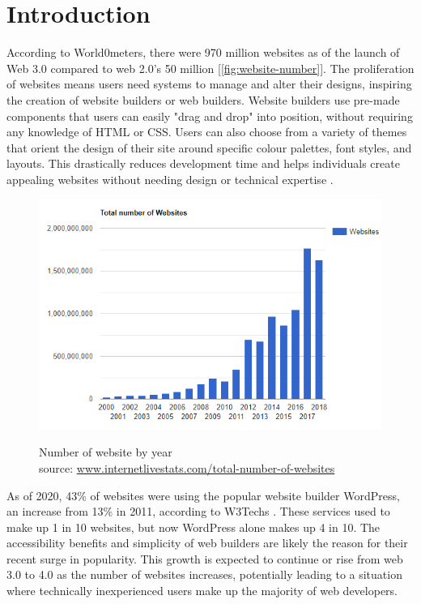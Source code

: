 \documentclass[article]{IEEEtran}
\begin{document}
    \section{Introduction}
        According to World0meters, there were 970 million websites as of the launch of Web 3.0 compared to web 2.0's 50 million \cite{internet} [\autoref{fig:website-number}]. The proliferation of websites means users need systems to manage and alter their designs, inspiring the creation of website builders or web builders. Website builders use pre-made components that users can easily "drag and drop" into position, without requiring any knowledge of HTML or CSS. Users can also choose from a variety of themes that orient the design of their site around specific colour palettes, font styles, and layouts. This drastically reduces development time and helps individuals create appealing websites without needing design or technical expertise \cite{pillai}.
                
        \begin{figure}[h]
            \caption{Number of website by year \\\hspace{\textwidth} source: \url{www.internetlivestats.com/total-number-of-websites} \cite{internet}}
            \includegraphics[width=\columnwidth]{images/website-number.png}
            \label{fig:website-number}
        \end{figure}
        
        As of 2020, 43\% of websites were using the popular website builder WordPress, an increase from 13\% in 2011, according to W3Techs \cite{w3}. These services used to make up 1 in 10 websites, but now WordPress alone makes up 4 in 10. The accessibility benefits and simplicity of web builders are likely the reason for their recent surge in popularity. This growth is expected to continue or rise from web 3.0 to 4.0 as the number of websites increases, potentially leading to a situation where technically inexperienced users make up the majority of web developers.
        
\end{document}
